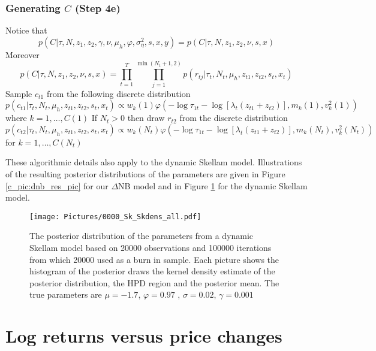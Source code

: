 \documentclass[12pt]{article}
\begin{document}
\subsubsection*{Generating $C$ (Step 4e) }
Notice that 
\begin{equation}
p(C | \tau, N,z_1 , z_2,\gamma,\nu, \mu_{h} ,\varphi,\sigma^{2}_{\eta},s,x,y )= p(C|\tau, N,z_1 , z_2,\nu, s,x)
\end{equation}
Moreover
\begin{equation}
 p(C|\tau, N,z_1 , z_2,\nu, s,x)= \prod \limits_{t=1}^{T} \prod \limits_{j=1}^{\min(N_t+1,2)} p(r_{tj}| \tau_{t}, N_t,\mu_{h},z_{t1}, z_{t2},s_t, x_t )
\end{equation}
Sample $c_{t1}$ from the following discrete distribution 
\begin{equation}
p(c_{t1}| \tau_{t}, N_t,\mu_{h},z_{t1}, z_{t2},s_t, x_t )\propto w_{k}(1) \varphi ( - \log \tau_{1t} - \log [\lambda_t (z_{t1}+ z_{t2}) ] , m_{k}(1), v_{k}^2(1) )
\end{equation}
where $k=1,\ldots, C(1)$
If $N_t >0$ then draw $r_{t2}$ from the discrete distribution 
\begin{equation}
p(c_{t2}| \tau_{t}, N_t,\mu_{h},z_{t1}, z_{t2},s_t, x_t )\propto w_{k}(N_t) \varphi ( - \log \tau_{1t} - \log [\lambda_t (z_{t1}+ z_{t2}) ] , m_{k}(N_t), v_{k}^2(N_t) ) \nonumber
\end{equation}
for $k=1,\ldots, C(N_t)$

These algorithmic details also apply to the dynamic Skellam model.
Illustrations of the resulting posterior distributions of the parameters
are given in Figure \ref{c_pic:dnb_res_pic} for our $\Delta$NB model and
in Figure \ref{c_pic:skellam_res_pic} for the dynamic Skellam model.

\begin{figure}[!htp]
  \centering 
\texttt{[image: Pictures/0000\_Sk\_Skdens\_all.pdf]}
       \caption{ The posterior distribution of the parameters from a dynamic Skellam model based on 20000 observations and 100000 iterations from which 20000 used as a burn in sample. Each picture shows the histogram of the posterior draws the kernel density estimate of the posterior distribution, the HPD region and the posterior mean. The true parameters are $\mu=-1.7$, $\varphi=0.97$ , $\sigma=0.02$, $\gamma=0.001$ }
 \label{c_pic:skellam_res_pic}
 \end{figure} 



\section{Log returns versus price changes}
\end{document}
